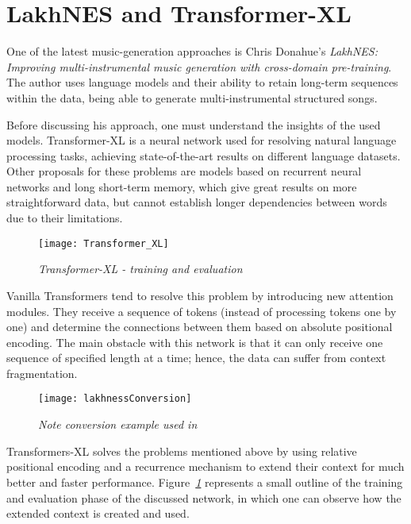 \section{LakhNES and Transformer-XL}

One of the latest music-generation approaches is Chris Donahue's
\emph{LakhNES: Improving multi-instrumental music generation with cross-domain pre-training}.
The author uses language models and their ability to retain long-term sequences within the data,
being able to generate multi-instrumental structured songs. \cite{donahue2019lakhnes}


Before discussing his approach,
one must understand the insights of the used models.
Transformer-XL is a neural network used for resolving natural language processing tasks,
achieving state-of-the-art results on different language datasets.
Other proposals for these problems are models based on recurrent neural networks and long
short-term memory, which give great results on more straightforward data,
but cannot establish longer dependencies between words due to their limitations. \cite{transformerXLMedium}

\begin{figure}[h]
  \centering
  \texttt{[image: Transformer\_XL]}
  \caption{\emph{Transformer-XL - training and evaluation \cite{transformerXLMedium}}}
  \label{fig:transformerXLMedium}
\end{figure}

Vanilla Transformers tend to resolve this problem by introducing new attention modules.
They receive a sequence of tokens (instead of processing tokens one by one)
and determine the connections between them based on absolute positional encoding.
The main obstacle with this network is that it can only receive
one sequence of specified length at a time;
hence, the data can suffer from context fragmentation. \cite{transformerXLMedium}


\begin{wrapfigure}{L}{0.5\textwidth}
  \centering
  \texttt{[image: lakhnessConversion]}
  \caption{\emph{Note conversion example used in \cite{donahue2019lakhnes}}}
  \label{fig:noteConversion}
\end{wrapfigure}

Transformers-XL solves the problems mentioned above by
using relative positional encoding and a recurrence mechanism
to extend their context for much better and faster performance.
Figure\emph{~\ref{fig:transformerXLMedium}} represents a small outline of the training and evaluation phase of the discussed network,
in which one can observe how the extended context is created and used.




